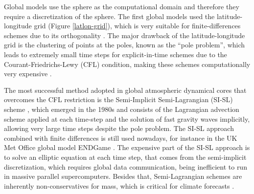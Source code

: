 Global models use the sphere as the computational domain and therefore they require a discretization
of the sphere. 
The first global models used the latitude-longitude grid (Figure \ref{latlon-grid}), which is
very suitable for finite-differences schemes due to its orthogonality \citep{will:2007}. The major drawback of the latitude-longitude grid
is the clustering of points at the poles, known as the ``pole problem'', which leads to extremely
small time steps for explicit-in-time schemes due to the Courant-Friedrichs-Lewy (CFL) condition, 
making these schemes computationally very expensive \citep{randall:2020}.

The most successful method adopted in global atmospheric dynamical cores that overcomes the CFL 
restriction is the Semi-Implicit Semi-Lagrangian (SI-SL) scheme \citep{randall:2018}, which 
emerged in the 1980s and consists of the Lagrangian advection scheme applied at each time-step 
and the solution of fast gravity waves implicitly, allowing very large time steps despite the pole problem.
The SI-SL approach combined with finite differences is still used nowadays, for instance in 
the UK Met Office global model ENDGame \citep{wood:2014, benacchio:2016}.
The expensive part of the  SI-SL approach is to solve an elliptic equation at each time step,
that comes from the semi-implicit discretization, which requires global data communication,
being inefficient to run in massive parallel supercomputers. Besides that, 
Semi-Lagrangian schemes are inherently non-conservatives for mass,
which is critical for climate forecasts \citep{will:2007}.

